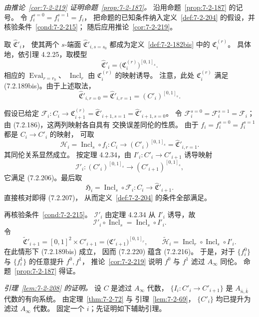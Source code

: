 
\par\noindent\textit{由推论~\ref{cor:7-2-219} 证明命题~\ref{prop:7-2-187}。}
沿用命题~\ref{prop:7-2-187} 的记号。
令 $f_i^{s=0}=f_i^{s=1}=f_i$，
把命题的已知条件纳入定义~\ref{def:7-2-204}
的假设，并核验条件~\ref{cond:7-2-215}；
随后应用推论~\ref{cor:7-2-219}。

取 $\widehat{\mathfrak C}'_i$，
使其两个 $s$-端面
$\widehat{\mathfrak C}'_{i,s=s_0}$
都成为定义~\ref{def:7-2-182bis}
中的 $\mathfrak C_i^{(r)}$。
具体地，依引理 4.2.25，取模型
\[
\widehat{\mathfrak C}'_i
=\bigl(\mathfrak C_i^{(r)}\bigr)^{[0,1]_s}.
\]
相应的 $\operatorname{Eval}_{r=r_0}$、
$\operatorname{Incl}_r$
由 $\mathfrak C_i^{(r)}$ 的映射诱导。
注意，此处 $\mathfrak C_i^{(r)}$
满足 (7.2.189bis)。由于上述取法，
\[
\widehat{\mathfrak C}'_{i,r=0}
=\widehat{\mathfrak C}'_{i,r=1}
=(C'_i)^{[0,1]_s}.
\]

假设已给定
$\mathcal F_i\colon C_i\to
\mathfrak C_{i+1}^{(r)}
=\widehat{\mathfrak C}'_{i+1,s=1}
=\widehat{\mathfrak C}'_{i+1,s=0}$。
令 $\mathcal F_i^{s=0}=\mathcal F_i^{s=1}=\mathcal F_i$；
由 (7.2.186)，这两列映射各自具有
交换误差同伦的性质。
由于 $f_i=f_i^{s=0}=f_i^{s=1}$
都是 $C_i\to C'_i$ 的映射，
可取
\[
\mathcal H_i=\operatorname{Incl}_s\circ f_i
\colon C_i\longrightarrow
(C'_i)^{[0,1]_s}
=\widehat{\mathfrak C}'_{i,r=1}.
\]
其同伦关系显然成立。
按定理 4.2.34，由
$I'_i\colon C'_i\to C'_{i+1}$ 诱导映射
\[
\mathcal I'_i\colon(C'_i)^{[0,1]_s}
\longrightarrow(C'_{i+1})^{[0,1]_s},
\]
它满足 (7.2.206)。最后取
\[
\mathfrak H_i
=\operatorname{Incl}_s\circ\mathcal F_i
\colon C_i\longrightarrow\widehat{\mathfrak C}'_{i+1}.
\]
直接核对即得 (7.2.207)，
从而定义~\ref{def:7-2-204} 的条件全部满足。

再核验条件~\ref{cond:7-2-215}。
$\mathcal I'_i$ 由定理 4.2.34
从 $I'_i$ 诱导，故
\begin{equation}
\mathcal I'_i\circ\operatorname{Incl}_s
=\operatorname{Incl}_s\circ I'_i.
\tag{7.2.220}\label{eq:7-2-220}
\end{equation}
令
\[
\widetilde{\mathfrak C}'_{i+1}
=[0,1]^2\times C'_{i+1}
=\bigl(\mathfrak C'_{i+1}\bigr)^{[0,1]_r},
\qquad
\widetilde{\mathcal H}_i
=\operatorname{Incl}_r\circ
\operatorname{Incl}_s\circ I'_i.
\]
在此情形下 (7.2.189bis) 成立，
因而 (7.2.220) 蕴含 (7.2.216)。
于是，对于 $\{f_i^0\}$ 与 $\{f_i^1\}$
的任意提升 $f^0,f^1$，
推论~\ref{cor:7-2-219} 说明
$f^0$ 与 $f^1$ 滤过 $A_\infty$ 同伦。
命题~\ref{prop:7-2-187} 得证。

\par\noindent\textit{引理~\ref{lem:7-2-208} 的证明。}
设 $C$ 是滤过 $A_\infty$ 代数，
$\{I_i\colon C'_i\to C'_{i+1}\}$
是 $A_{\bar n,\bar k}$ 代数的有向系统。
由定理~\ref{thm:7-2-72} 与
引理~\ref{lem:7-2-69}，
$\{C'_i\}$ 均已提升为滤过 $A_\infty$ 代数。
固定一个 $i$；先证明如下辅助引理。

